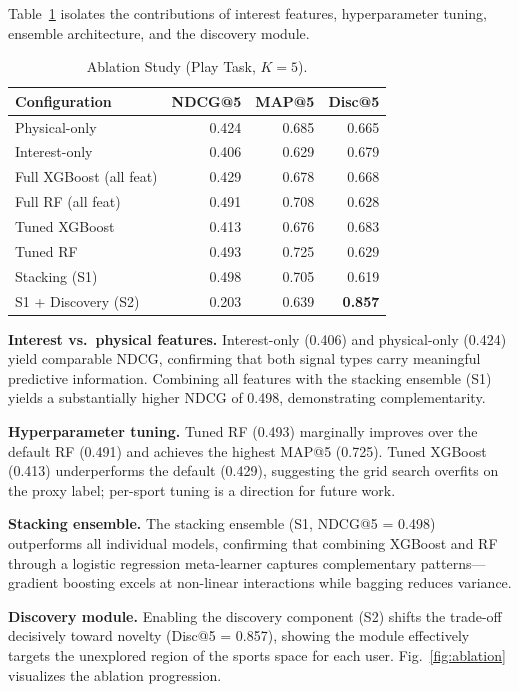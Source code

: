 \documentclass[conference]{IEEEtran}
\begin{document}
Table~\ref{tab:ablation} isolates the contributions of interest features,
hyperparameter tuning, ensemble architecture, and the discovery module.

\begin{table}[t]
\caption{Ablation Study (Play Task, $K{=}5$).}
\label{tab:ablation}
\centering
\small
\begin{tabular}{lrrr}
\toprule
\textbf{Configuration} & \textbf{NDCG@5} & \textbf{MAP@5} & \textbf{Disc@5} \\
\midrule
Physical-only           & 0.424 & 0.685 & 0.665 \\
Interest-only           & 0.406 & 0.629 & 0.679 \\
Full XGBoost (all feat) & 0.429 & 0.678 & 0.668 \\
Full RF (all feat)      & 0.491 & 0.708 & 0.628 \\
Tuned XGBoost           & 0.413 & 0.676 & 0.683 \\
Tuned RF                & 0.493 & 0.725 & 0.629 \\
Stacking (S1)           & 0.498 & 0.705 & 0.619 \\
S1 + Discovery (S2)     & 0.203 & 0.639 & \textbf{0.857} \\
\bottomrule
\end{tabular}
\end{table}

\noindent\textbf{Interest vs.\ physical features.}
Interest-only (0.406) and physical-only (0.424) yield comparable NDCG,
confirming that both signal types carry meaningful predictive information.
Combining all features with the stacking ensemble (S1) yields a
substantially higher NDCG of 0.498, demonstrating complementarity.

\noindent\textbf{Hyperparameter tuning.}
Tuned RF (0.493) marginally improves over the default RF (0.491) and
achieves the highest MAP@5 (0.725). Tuned XGBoost (0.413) underperforms
the default (0.429), suggesting the grid search overfits on the proxy
label; per-sport tuning is a direction for future work.

\noindent\textbf{Stacking ensemble.}
The stacking ensemble (S1, NDCG@5 = 0.498) outperforms all individual
models, confirming that combining XGBoost and RF through a logistic
regression meta-learner captures complementary patterns---gradient
boosting excels at non-linear interactions while bagging reduces variance.

\noindent\textbf{Discovery module.}
Enabling the discovery component (S2) shifts the trade-off decisively toward
novelty (Disc@5 = 0.857), showing the module effectively targets the
unexplored region of the sports space for each user.
Fig.~\ref{fig:ablation} visualizes the ablation progression.
\end{document}

